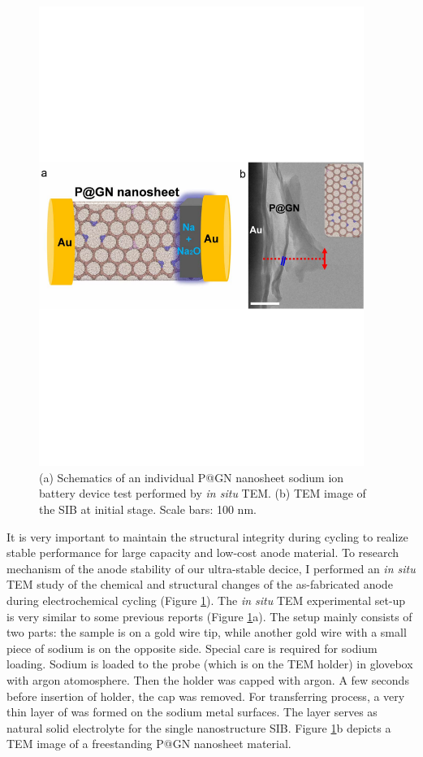\begin{figure}  
\centering
\includegraphics[width=300pt,angle=0]{figures/figure4_3ab}
\caption[{\it In situ} probing on P@GN SIB setup]
{
(a) Schematics of an individual P@GN nanosheet sodium ion battery device test performed by {\em in situ} TEM. 
(b) TEM image of the SIB at initial stage. Scale bars: 100 nm.
\label{fig:4_3ab}}
\end{figure}

It is very important to maintain the structural integrity during cycling to realize stable performance for large capacity and low-cost anode material.\cite{Liu2014a} 
To research mechanism of the anode stability of our ultra-stable decice, I performed an {\em in situ} TEM study of the chemical and structural changes of the as-fabricated anode during electrochemical cycling (Figure \ref{fig:4_3ab}). The {\em in situ} TEM experimental set-up is very similar to some previous reports (Figure \ref{fig:4_3ab}a).\cite{Wang2014f,Wang2012g} 
The setup mainly consists of two parts: the sample is on a gold wire tip, while another gold wire with a small piece of sodium is on the opposite side. Special care is required for sodium loading. Sodium is loaded to the probe (which is on the TEM holder) in glovebox with argon atomosphere. Then the holder was capped with argon. A few seconds before insertion of holder, the cap was removed. 
For transferring process, a very thin layer of  was formed on the sodium metal surfaces. The  layer serves as natural solid electrolyte for the single nanostructure SIB. Figure \ref{fig:4_3ab}b depicts a TEM image of a freestanding P@GN nanosheet material. 

